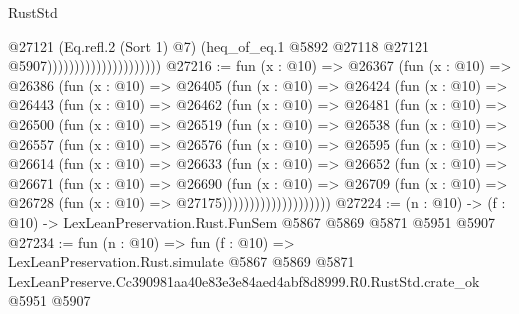\begin{lexlean}{RustStd}
\begin{coremodule}
                                            @27121
                                            (Eq.refl.{2} (Sort 1) @7)
                                            (heq_of_eq.{1}
                                              @5892
                                              @27118
                                              @27121
                                              @5907)))))))))))))))))))))
@27216 := fun (x : @10) =>
  @26367
    (fun (x : @10) =>
    @26386
      (fun (x : @10) =>
      @26405
        (fun (x : @10) =>
        @26424
          (fun (x : @10) =>
          @26443
            (fun (x : @10) =>
            @26462
              (fun (x : @10) =>
              @26481
                (fun (x : @10) =>
                @26500
                  (fun (x : @10) =>
                  @26519
                    (fun (x : @10) =>
                    @26538
                      (fun (x : @10) =>
                      @26557
                        (fun (x : @10) =>
                        @26576
                          (fun (x : @10) =>
                          @26595
                            (fun (x : @10) =>
                            @26614
                              (fun (x : @10) =>
                              @26633
                                (fun (x : @10) =>
                                @26652
                                  (fun (x : @10) =>
                                  @26671
                                    (fun (x : @10) =>
                                    @26690
                                      (fun (x : @10) =>
                                      @26709
                                        (fun (x : @10) =>
                                        @26728 (fun (x : @10) => @27175))))))))))))))))))))
@27224 := (n : @10) -> (f : @10) -> LexLeanPreservation.Rust.FunSem @5867 @5869 @5871 @5951 @5907
@27234 := fun (n : @10) =>
  fun (f : @10) =>
  LexLeanPreservation.Rust.simulate
    @5867
    @5869
    @5871
    LexLeanPreserve.Cc390981aa40e83e3e84aed4abf8d8999.R0.RustStd.crate_ok
    @5951
    @5907
\end{coremodule}
\end{lexlean}
